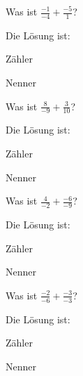 \documentclass{ximera}
\begin{document}
\begin{shuffle}
\begin{question}
Was ist $\frac{-1}{-4} + \frac{-5}{1}$?
\begin{solution}
Die Lösung ist:

Zähler 

Nenner 
\end{solution}
\end{question}


\begin{question}
Was ist $\frac{8}{-9} + \frac{3}{10}$?
\begin{solution}
Die Lösung ist:

Zähler 

Nenner 
\end{solution}
\end{question}


\begin{question}
Was ist $\frac{4}{-2} + \frac{-6}{-9}$?
\begin{solution}
Die Lösung ist:

Zähler 

Nenner 
\end{solution}
\end{question}


\begin{question}
Was ist $\frac{-2}{-6} + \frac{-3}{-3}$?
\begin{solution}
Die Lösung ist:

Zähler 

Nenner 
\end{solution}
\end{question}

\end{shuffle}
\end{document}
